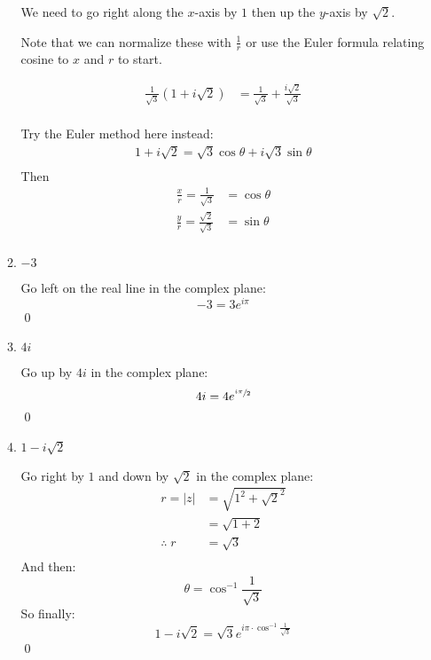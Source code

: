 \begin{enumerate}
\begin{enumerate}
		            We need to go right along the $x$-axis by $1$ then up the $y$-axis by $\sqrt{2}.$

		            Note that we can normalize these with $\frac{1}{r}$ or use the Euler formula relating
		            cosine to $x$ and $r$ to start.

		            \begin{align*}
			            \frac{1}{\sqrt{3}}(1 + i\sqrt{2}) & = \frac{1}{\sqrt{3}}
			            + \frac{i\sqrt{2}}{\sqrt{3}}                             \\
		            \end{align*}

		            Try the Euler method here instead:
		            \begin{align*}
			            1 + i\sqrt{2} = \sqrt{3}\cos\theta + i\sqrt{3}\sin\theta \\
		            \end{align*}
		            Then
		            \begin{align*}
			            \frac{x}{r} = \frac{1}{\sqrt{3}}        & = \cos\theta \\
			            \frac{y}{r} = \frac{\sqrt{2}}{\sqrt{3}} & = \sin\theta \\
		            \end{align*}

		      \item $-3$

		            Go left on the real line in the complex plane:
		            \[-3 = 3e^{i\pi} \]
		            \qed

		      \item $4i$

		            Go up by $4i$ in the complex plane:
		            \[4i = 4e^{\sfrac{i\pi}{2}} \]
		            \qed

		      \item $1 -i\sqrt{2}$

		            Go right by $1$ and down by $\sqrt{2}$ in the complex plane:
		            \begin{align*}
			            r = |z| & = \sqrt{1^2 + \sqrt{2}^2} \\
			                    & = \sqrt{1 + 2}            \\
			            \therefore \; r
			                    & = \sqrt{3}                \\
		            \end{align*}
		            And then:
		            \[ \theta = \cos^{-1}{\frac{1}{\sqrt{3}}} \]
		            So finally:
		            \[ 1 -i\sqrt{2} = \sqrt{3}e^{i\pi\cdot \cos^{-1}{\frac{1}{\sqrt{3}}} } \]
		            \qed



\end{enumerate}
\end{enumerate}
